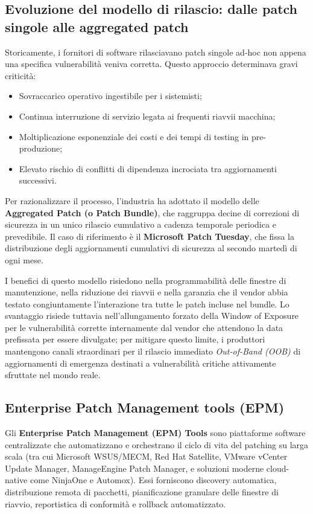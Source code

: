 \documentclass[../../main.tex]{subfiles}
\begin{document}
\subsection{Evoluzione del modello di rilascio: dalle patch singole alle aggregated patch}
Storicamente, i fornitori di software rilasciavano patch singole ad-hoc non appena una specifica vulnerabilità veniva corretta. Questo approccio determinava gravi criticità:
\begin{itemize}
    \item Sovraccarico operativo ingestibile per i sistemisti;
    \item Continua interruzione di servizio legata ai frequenti riavvii macchina;
    \item Moltiplicazione esponenziale dei costi e dei tempi di testing in pre-produzione;
    \item Elevato rischio di conflitti di dipendenza incrociata tra aggiornamenti successivi.
\end{itemize}

Per razionalizzare il processo, l'industria ha adottato il modello delle \textbf{Aggregated Patch (o Patch Bundle)}, che raggruppa decine di correzioni di sicurezza in un unico rilascio cumulativo a cadenza temporale periodica e prevedibile. Il caso di riferimento è il \textbf{Microsoft Patch Tuesday}, che fissa la distribuzione degli aggiornamenti cumulativi di sicurezza al secondo martedì di ogni mese.

I benefici di questo modello risiedono nella programmabilità delle finestre di manutenzione, nella riduzione dei riavvii e nella garanzia che il vendor abbia testato congiuntamente l'interazione tra tutte le patch incluse nel bundle. Lo svantaggio risiede tuttavia nell'allungamento forzato della Window of Exposure per le vulnerabilità corrette internamente dal vendor che attendono la data prefissata per essere divulgate; per mitigare questo limite, i produttori mantengono canali straordinari per il rilascio immediato \textit{Out-of-Band (OOB)} di aggiornamenti di emergenza destinati a vulnerabilità critiche attivamente sfruttate nel mondo reale.

\subsection{Enterprise Patch Management tools (EPM)}
Gli \textbf{Enterprise Patch Management (EPM) Tools} sono piattaforme software centralizzate che automatizzano e orchestrano il ciclo di vita del patching su larga scala (tra cui Microsoft WSUS/MECM, Red Hat Satellite, VMware vCenter Update Manager, ManageEngine Patch Manager, e soluzioni moderne cloud-native come NinjaOne e Automox). Essi forniscono discovery automatica, distribuzione remota di pacchetti, pianificazione granulare delle finestre di riavvio, reportistica di conformità e rollback automatizzato.
\end{document}
